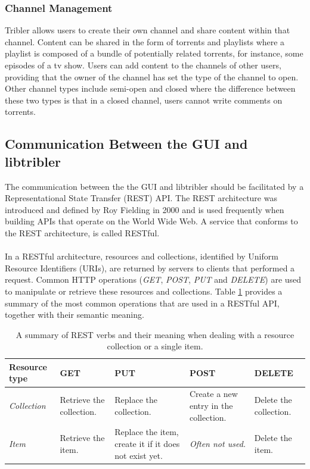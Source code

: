 \subsubsection{\textbf{Channel Management}}
Tribler allows users to create their own channel and share content within that channel. Content can be shared in the form of torrents and playlists where a playlist is composed of a bundle of potentially related torrents, for instance, some episodes of a tv show. Users can add content to the channels of other users, providing that the owner of the channel has set the type of the channel to open. Other channel types include semi-open and closed where the difference between these two types is that in a closed channel, users cannot write comments on torrents.

\subsection{Communication Between the GUI and libtribler}
\label{subsec:communication-gui-libtribler}
The communication between the the GUI and libtribler should be facilitated by a Representational State Transfer (REST) API. The REST architecture was introduced and defined by Roy Fielding in 2000\cite{fielding2000fielding} and is used frequently when building APIs that operate on the World Wide Web. A service that conforms to the REST architecture, is called RESTful.\\\\
In a RESTful architecture, resources and collections, identified by Uniform Resource Identifiers (URIs), are returned by servers to clients that performed a request. Common HTTP operations (\emph{GET}, \emph{POST}, \emph{PUT} and \emph{DELETE}) are used to manipulate or retrieve these resources and collections. Table \ref{table:rest-api-operations} provides a summary of the most common operations that are used in a RESTful API, together with their semantic meaning.\\

\begin{table}[h!]
	\centering
	\begin{tabularx}{\textwidth}{|X|X|X|X|X|}
		\hline
		\textbf{Resource type} & \textbf{GET} & \textbf{PUT} & \textbf{POST} & \textbf{DELETE} \\ \hline
		\emph{Collection} & Retrieve the collection. & Replace the collection. & Create a new entry in the collection. & Delete the collection.\\ \hline
		\emph{Item} & Retrieve the item. & Replace the item, create it if it does not exist yet. & \emph{Often not used.} & Delete the item.\\ \hline
	\end{tabularx}
	\caption{A summary of REST verbs and their meaning when dealing with a resource collection or a single item.}
	\label{table:rest-api-operations}
\end{table}

